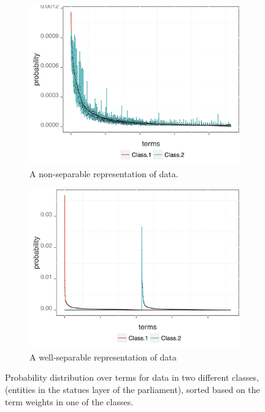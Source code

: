 \begin{figure}[t]
\centering
\begin{subfigure}{0.49\textwidth}
\includegraphics[width=\linewidth]{02-part-01/chapter-03/figs_and_tables/img_example-slm.png}
\caption{\label{fig:sep-slm} \scriptsize{A non-separable representation of data.}}
\end{subfigure}
\hfill
\begin{subfigure}{0.49\textwidth}
\includegraphics[width=\linewidth]{02-part-01/chapter-03/figs_and_tables/img_example-swlm.png}
\caption{\label{fig:sep-swlm} \scriptsize{A well-separable representation of data}}
\end{subfigure}
\caption{\label{fig:sep_rep} Probability distribution over terms for data in two different classes, (entities in the statues layer of the parliament), sorted based on the term weights in one of the classes.}
\end{figure}